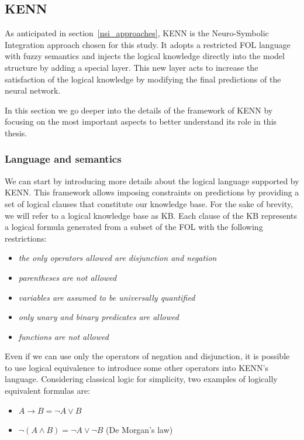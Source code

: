 \subsection{KENN} \label{kenn_architecture}
As anticipated in section~\ref{nsi_approaches}, KENN is the Neuro-Symbolic Integration approach chosen for this study. It adopts a restricted FOL language with fuzzy semantics and injects the logical knowledge directly into the model structure by adding a special layer. This new layer acts to increase the satisfaction of the logical knowledge by modifying the final predictions of the neural network.

In this section we go deeper into the details of the framework of KENN by focusing on the most important aspects to better understand its role in this thesis.

\subsubsection{Language and semantics}
We can start by introducing more details about the logical language supported by KENN. This framework allows imposing constraints on predictions by providing a set of logical clauses that constitute our knowledge base. For the sake of brevity, we will refer to a logical knowledge base as KB. Each clause of the KB represents a logical formula generated from a subset of the FOL with the following restrictions:
\begin{itemize}
    \item \textit{the only operators allowed are disjunction and negation}
    \item \textit{parentheses are not allowed}
    \item \textit{variables are assumed to be universally quantified}
    \item \textit{only unary and binary predicates are allowed}
    \item \textit{functions are not allowed}
\end{itemize}
Even if we can use only the operators of negation and disjunction, it is possible to use logical equivalence to introduce some other operators into KENN's language. Considering classical logic for simplicity, two examples of logically equivalent formulas are:
\begin{itemize}
    \item  $ A \to B = \neg A \vee B $
    \item  $ \neg ( A \wedge B) = \neg A \vee \neg B $ (De Morgan's law)
\end{itemize}
